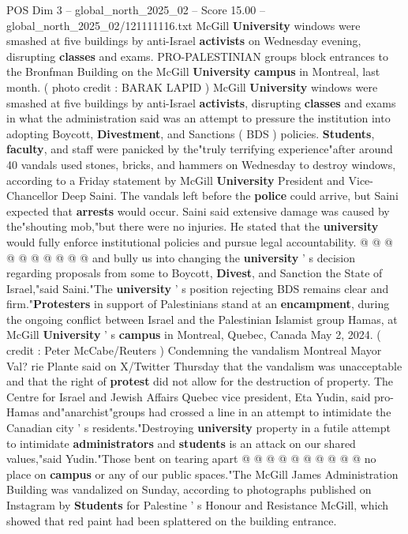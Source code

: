 \begin{textsample}{POS Dim 3 – global\_north\_2025\_02 – Score 15.00 – global\_north\_2025\_02/121111116.txt}  \label{ex:f3_pos_286}
McGill \textbf{University} windows were smashed at five buildings by anti-Israel \textbf{activists} on Wednesday evening, disrupting \textbf{classes} and exams.
PRO-PALESTINIAN groups block entrances to the Bronfman Building on the McGill \textbf{University} \textbf{campus} in Montreal, last month. ( photo credit : BARAK LAPID ) McGill \textbf{University} windows were smashed at five buildings by anti-Israel \textbf{activists}, disrupting \textbf{classes} and exams in what the administration said was an attempt to pressure the institution into adopting Boycott, \textbf{Divestment}, and Sanctions ( BDS ) policies. \textbf{Students}, \textbf{faculty}, and staff were panicked by the"truly terrifying experience"after around 40 vandals used stones, bricks, and hammers on Wednesday to destroy windows, according to a Friday statement by McGill \textbf{University} President and Vice-Chancellor Deep Saini.
The vandals left before the \textbf{police} could arrive, but Saini expected that \textbf{arrests} would occur.
Saini said extensive damage was caused by the"shouting mob,"but there were no injuries.
He stated that the \textbf{university} would fully enforce institutional policies and pursue legal accountability. @ @ @ @ @ @ @ @ @ @ and bully us into changing the \textbf{university} ' s decision regarding proposals from some to Boycott, \textbf{Divest}, and Sanction the State of Israel,"said Saini."The \textbf{university} ' s position rejecting BDS remains clear and firm."\textbf{Protesters} in support of Palestinians stand at an \textbf{encampment}, during the ongoing conflict between Israel and the Palestinian Islamist group Hamas, at McGill \textbf{University} ' s \textbf{campus} in Montreal, Quebec, Canada May 2, 2024. ( credit : Peter McCabe/Reuters ) Condemning the vandalism Montreal Mayor Val? rie Plante said on X/Twitter Thursday that the vandalism was unacceptable and that the right of \textbf{protest} did not allow for the destruction of property.
The Centre for Israel and Jewish Affairs Quebec vice president, Eta Yudin, said pro-Hamas and"anarchist"groups had crossed a line in an attempt to intimidate the Canadian city ' s residents."Destroying \textbf{university} property in a futile attempt to intimidate \textbf{administrators} and \textbf{students} is an attack on our shared values,"said Yudin."Those bent on tearing apart @ @ @ @ @ @ @ @ @ @ no place on \textbf{campus} or any of our public spaces."The McGill James Administration Building was vandalized on Sunday, according to photographs published on Instagram by \textbf{Students} for Palestine ' s Honour and Resistance McGill, which showed that red paint had been splattered on the building entrance.

\end{textsample}
